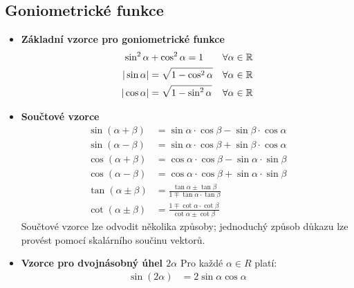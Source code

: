 \subsection{Goniometrické funkce}  
    \begin{itemize}
      \item \textbf{Základní vzorce pro goniometrické funkce}
        \begin{align}
          \sin^2\alpha &+ \cos^2\alpha = 1       &\forall\alpha\in\mathbb{R} \label{MA1:eq_sincos} \\ 
          |\sin\alpha| &= \sqrt{1-\cos^2\alpha}  &\forall\alpha\in\mathbb{R} \label{MA1:eq_sinabs} \\ 
          |\cos\alpha| &= \sqrt{1-\sin^2\alpha}  &\forall\alpha\in\mathbb{R} \label{MA1:eq_cosabs}
        \end{align}  
      \item \textbf{Součtové vzorce}
        \begin{align}
          \sin(\alpha + \beta) 
            &= \sin\alpha\cdot\cos\beta 
             - \sin\beta\cdot\cos\alpha           \label{MA1:eq_sinxpy}  \\ 
          \sin(\alpha - \beta) 
            &= \sin\alpha\cdot\cos\beta 
             + \sin\beta\cdot\cos\alpha           \label{MA1:eq_sinxmy}  \\ 
          \cos(\alpha + \beta) 
            &= \cos\alpha\cdot\cos\beta 
             - \sin\alpha\cdot\sin\beta           \label{MA1:eq_cosxpy}  \\ 
          \cos(\alpha - \beta) 
            &= \cos\alpha\cdot\cos\beta 
             + \sin\alpha\cdot\sin\beta           \label{MA1:eq_cosxmy}  \\ 
          \tan(\alpha\pm\beta) 
            &= \frac{\tan\alpha\pm\tan\beta}{1\mp\tan\alpha\cdot\tan\beta} \label{MA1:eq_tanxpmy}\\ 
          \cot(\alpha\pm\beta) 
            &= \frac{1\mp\cot\alpha\cdot\cot\beta}{\cot\alpha\pm \cot\beta} \label{MA1:eq_cotxpmy}
        \end{align}
        Součtové vzorce lze odvodit několika způsoby; jednoduchý způsob důkazu lze provést pomocí skalárního součinu vektorů.
      \item \textbf{Vzorce pro dvojnásobný úhel $2\alpha$}
        \newline Pro každé $\alpha\in R$ platí:
        \begin{align}
          \sin(2\alpha)   &= 2\sin\alpha\cos\alpha                \label{MA1:eq_sin2x} \\ 

\end{align}
\end{itemize}
